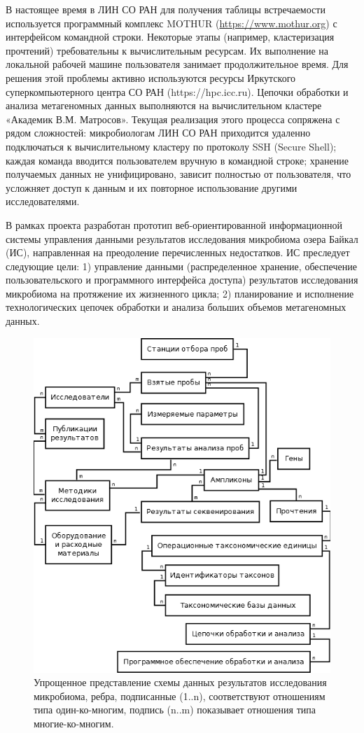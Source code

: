 \documentclass[a4paper,12pt,openany,final]{extreport}
\def\oldcaption{} \let\oldcaption=\caption
\def\caption{\stepcounter{captionsnum}\oldcaption}
\begin{document}
В настоящее время в ЛИН СО РАН для получения таблицы встречаемости
используется программный комплекс MOTHUR
(\href{https://www.mothur.org}{{https://www.mothur.org}}) с интерфейсом
командной строки. Некоторые этапы (например, кластеризация прочтений)
требовательны к вычислительным ресурсам. Их выполнение на локальной
рабочей машине пользователя занимает продолжительное время. Для решения
этой проблемы активно используются ресурсы Иркутского суперкомпьютерного
центра СО РАН (https://hpc.icc.ru). Цепочки обработки и анализа
метагеномных данных выполняются на вычислительном кластере «Академик
В.М. Матросов». Текущая реализация этого процесса сопряжена с рядом
сложностей: микробиологам ЛИН СО РАН приходится удаленно подключаться к
вычислительному кластеру по протоколу SSH (Secure Shell); каждая команда
вводится пользователем вручную в командной строке; хранение получаемых
данных не унифицировано, зависит полностью от пользователя, что
усложняет доступ к данным и их повторное использование другими
исследователями.

В рамках проекта разработан прототип веб-ориентированной информационной
системы управления данными результатов исследования микробиома озера
Байкал (ИС), направленная на преодоление перечисленных недостатков. ИС
преследует следующие цели: 1) управление данными (распределенное
хранение, обеспечение пользовательского и программного интерфейса
доступа) результатов исследования микробиома на протяжение их жизненного
цикла; 2) планирование и исполнение технологических цепочек обработки и
анализа больших объемов метагеномных данных.

\begin{figure}\centering
\includegraphics[width=0.9\linewidth]{media/image15.png}

\caption{Упрощенное представление схемы данных результатов
исследования микробиома, ребра, подписанные (1..n), соответствуют
отношениям типа один-ко-многим, подпись (n..m) показывает отношения типа
многие-ко-многим.}\label{fig:schemabd}
\end{figure}
\end{document}
